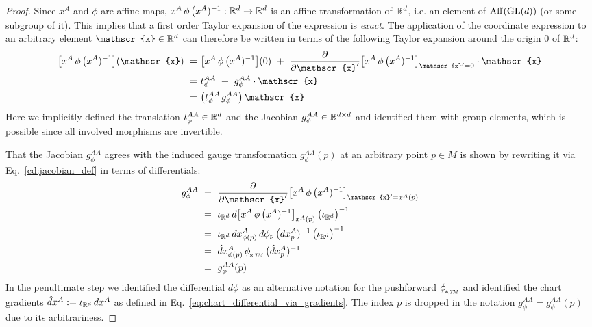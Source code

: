 \begin{proof}
    Since $x^A$ and $\phi$ are affine maps, $x^A \,\phi\, \big(x^A)^{-1}: \mathbb{R}^d \to \mathbb{R}^d$ is an affine transformation of $\mathbb{R}^d$, i.e. an element of $\operatorname{Aff}(\operatorname{GL}(d))$ (or some subgroup of it).
    This implies that a first order Taylor expansion of the expression is \emph{exact}.
    The application of the coordinate expression to an arbitrary element $\mathscr{x} \in \R^d$ can therefore be written in terms of the following Taylor expansion around the origin $0$ of $\mathbb{R}^d$:
    \begin{align}
        \big[ x^A \,\phi\, \big(x^A)^{-1} \big] (\mathscr{x})
        \ =&\ \big[ x^A \,\phi\, \big(x^A)^{-1} \big] (0)\ +\ 
            \frac{\partial}{\partial \mathscr{x}'} \big[ x^A \,\phi\, \big(x^A)^{-1} \big]_{\mathscr{x}' = 0} \cdot \mathscr{x} \notag \\
        \ =&\ t_\phi^{AA}\ +\ g_\phi^{AA} \cdot \mathscr{x} \notag \\
        \ =&\ \big( t_\phi^{AA} \mkern2mu g_\phi^{AA} \big) \, \mathscr{x}
    \end{align}
    Here we implicitly defined the translation $t_\phi^{AA} \in \mathbb{R}^d$ and the Jacobian $g_\phi^{AA} \in \mathbb{R}^{d\times d}$ and identified them with group elements, which is possible since all involved morphisms are invertible.

    That the Jacobian $g_\phi^{AA}$ agrees with the induced gauge transformation $g_\phi^{AA}(p)$ at an arbitrary point $p\in M$ is shown by rewriting it via Eq.~\eqref{cd:jacobian_def} in terms of differentials:
    \begin{align}
        g_\phi^{AA}
        \ &=\ \frac{\partial}{\partial \mathscr{x}'} \big[ x^A \,\phi\, \big(x^A)^{-1} \big]_{\mathscr{x}' = x^A(p)} \notag \\
        \ &=\ \iota_{\R^d}\, d\big[ x^A \,\phi\, \big(x^A)^{-1} \big]_{x^A(p)} \, \big(\iota_{\R^d} \big)^{-1} \notag \\
        \ &=\ \iota_{\R^d}\, dx^A_{\phi(p)} \,d\phi_p\, \big(dx^A_p)^{-1}\, \big(\iota_{\R^d} \big)^{-1} \notag \\
        \ &=\ \hat{d}x^A_{\phi(p)} \,\dphiTM\, \big(\hat{d}x^A_p)^{-1} \notag \\
        \ &=\ g_\phi^{AA}(p)
    \end{align}
    In the penultimate step we identified the differential $d\phi$ as an alternative notation for the pushforward $\dphiTM$ and identified the chart gradients $\hat{d}x^A := \iota_{\mathbb{R}^d}\, dx^A$ as defined in Eq.~\eqref{eq:chart_differential_via_gradients}.
    The index $p$ is dropped in the notation $g_\phi^{AA} = g_\phi^{AA}(p)$ due to its arbitrariness.


\end{proof}
